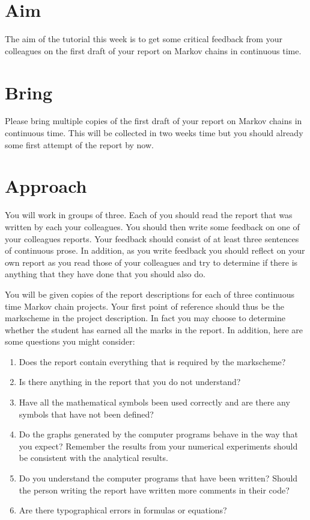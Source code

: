 \documentclass[a4paper]{article}
\begin{document}
\section{Aim}

The aim of the tutorial this week is to get some critical feedback from your colleagues on the first draft of your report on Markov chains in continuous time.

\section{Bring}

Please bring multiple copies of the first draft of your report on Markov chains in continuous time.  This will be collected in two weeks time but you should already some first attempt of the report 
by now.

\section{Approach}

You will work in groups of three.  Each of you should read the report that was written by each your colleagues. You should then write some feedback on one of your colleagues reports.  Your feedback 
should consist of at least three sentences of continuous prose.  In addition, as you write feedback you should reflect on your own report as you read those of your colleagues and try to determine if 
there is anything that they have done that you should also do.  

You will be given copies of the report descriptions for each of three continuous time Markov chain projects.  Your first point of reference should thus be the markscheme in the project description.  
In fact 
you may choose to determine whether the student has earned all the marks in the report.  In addition, here are some questions you might consider:

\begin{enumerate}
 \item Does the report contain everything that is required by the markscheme?
 \item Is there anything in the report that you do not understand?
 \item Have all the mathematical symbols been used correctly and are there any symbols that have not been defined?
 \item Do the graphs generated by the computer programs behave in the way that you expect?  Remember the results from your numerical experiments should be consistent with the analytical results.
 \item Do you understand the computer programs that have been written?  Should the person writing the report have written more comments in their code?
 \item Are there typographical errors in formulas or equations?
\end{enumerate}
\end{document}
